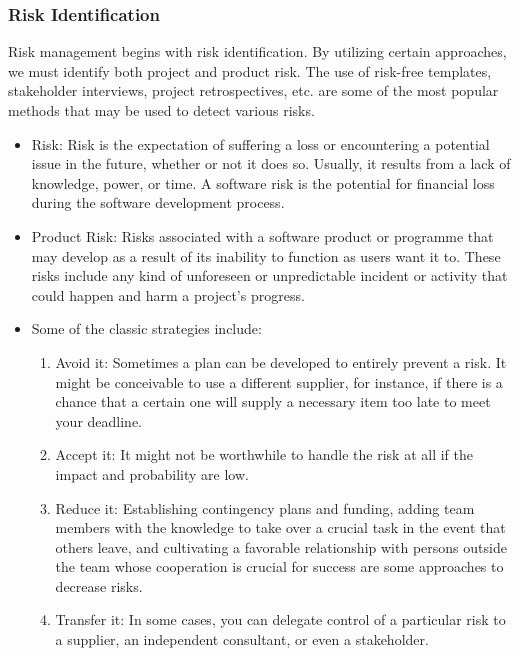\documentclass[oneside, 12pt]{book}
\begin{document}
\subsubsection{Risk Identification}
Risk management begins with risk identification. By utilizing certain approaches, we must identify both project and product risk. The use of risk-free templates, stakeholder interviews, project retrospectives, etc. are some of the most popular methods that may be used to detect various risks.
\begin{itemize}
	\item Risk: Risk is the expectation of suffering a loss or encountering a potential issue in the future, whether or not it does so. Usually, it results from a lack of knowledge, power, or time. A software risk is the potential for financial loss during the software development process.
	\item Product Risk: Risks associated with a software product or programme that may develop as a result of its inability to function as users want it to. These risks include any kind of unforeseen or unpredictable incident or activity that could happen and harm a project's progress.
	\item Some of the classic strategies include:
	      \begin{enumerate}
		      \item Avoid it: Sometimes a plan can be developed to entirely prevent a risk. It might be conceivable to use a different supplier, for instance, if there is a chance that a certain one will supply a necessary item too late to meet your deadline.
		      \item Accept it: It might not be worthwhile to handle the risk at all if the impact and probability are low.
		      \item Reduce it: Establishing contingency plans and funding, adding team members with the knowledge to take over a crucial task in the event that others leave, and cultivating a favorable relationship with persons outside the team whose cooperation is crucial for success are some approaches to decrease risks.
		      \item Transfer it: In some cases, you can delegate control of a particular risk to a supplier, an independent consultant, or even a stakeholder.
	      \end{enumerate}
\end{itemize}
\end{document}
